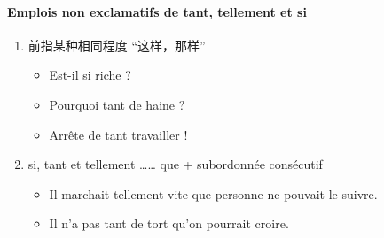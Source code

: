 \documentclass[UTF8]{report}
\begin{document}
\paragraph{Emplois non exclamatifs de tant, tellement et si}

\begin{enumerate}
    \item 前指某种相同程度 “这样，那样”
    \begin{itemize}
        \item Est-il si riche ?
        \item Pourquoi tant de haine ?
        \item Arrête de tant travailler !
    \end{itemize}
    \item si, tant et tellement …… que + subordonnée consécutif
    \begin{itemize}
        \item Il marchait tellement vite que personne ne pouvait le suivre.
        \item Il n’a pas tant de tort qu’on pourrait croire.
    \end{itemize}
\end{enumerate}
\end{document}
